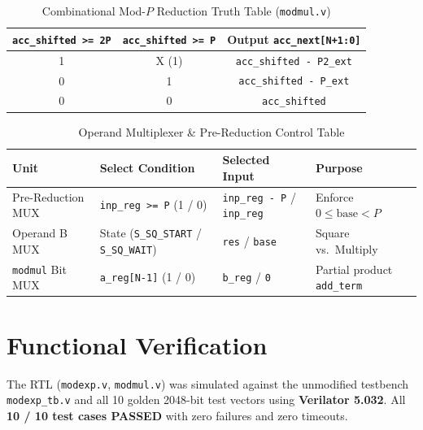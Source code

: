 \documentclass[11pt,a4paper]{article}
\begin{document}
\begin{table}[h!]
\centering
\caption{Combinational Mod-$P$ Reduction Truth Table (\texttt{modmul.v})}
\label{tab:red_tt}
\small
\begin{tabular}{@{}ccc@{}}
\toprule
\textbf{\texttt{acc\_shifted >= 2P}} & \textbf{\texttt{acc\_shifted >= P}} & \textbf{Output \texttt{acc\_next[N+1:0]}} \\
\midrule
1 & X (1) & \texttt{acc\_shifted - P2\_ext} \\
0 & 1 & \texttt{acc\_shifted - P\_ext} \\
0 & 0 & \texttt{acc\_shifted} \\
\bottomrule
\end{tabular}
\end{table}

\begin{table}[h!]
\centering
\caption{Operand Multiplexer \& Pre-Reduction Control Table}
\label{tab:mux_tt}
\small
\begin{tabular}{@{}llll@{}}
\toprule
\textbf{Unit} & \textbf{Select Condition} & \textbf{Selected Input} & \textbf{Purpose} \\
\midrule
Pre-Reduction MUX & \texttt{inp\_reg >= P} (1 / 0) & \texttt{inp\_reg - P} / \texttt{inp\_reg} & Enforce $0 \le \text{base} < P$ \\
Operand B MUX & State (\texttt{S\_SQ\_START} / \texttt{S\_SQ\_WAIT}) & \texttt{res} / \texttt{base} & Square vs.\ Multiply \\
\texttt{modmul} Bit MUX & \texttt{a\_reg[N-1]} (1 / 0) & \texttt{b\_reg} / \texttt{0} & Partial product \texttt{add\_term} \\
\bottomrule
\end{tabular}
\end{table}

\clearpage
\section{Functional Verification}
The RTL (\texttt{modexp.v}, \texttt{modmul.v}) was simulated against the unmodified testbench \texttt{modexp\_tb.v} and all 10 golden 2048-bit test vectors using \textbf{Verilator 5.032}. All \textbf{10 / 10 test cases PASSED} with zero failures and zero timeouts.
\end{document}
